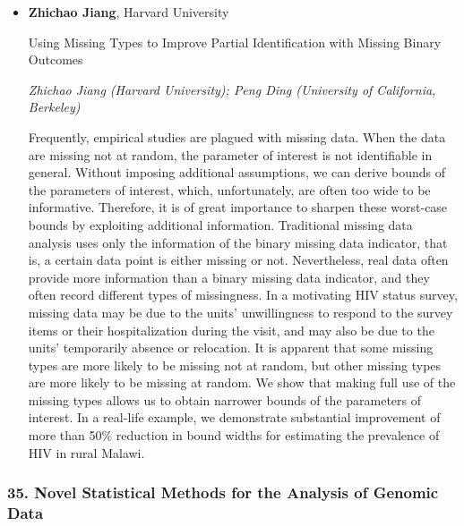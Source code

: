 \begin{itemize}
\item \textbf{Zhichao Jiang}, Harvard University

Using Missing Types to Improve Partial Identification with Missing Binary Outcomes

\emph{\footnotesize Zhichao Jiang (Harvard University); Peng Ding (University of California, Berkeley)}

Frequently, empirical studies are plagued with missing data. When the data are missing not at random, the parameter of interest is not identifiable in general. Without imposing additional assumptions, we can derive bounds of the parameters of interest, which, unfortunately, are often too wide to be informative. Therefore, it is of great importance to sharpen these worst-case bounds by exploiting additional information.  Traditional missing data analysis uses only the information of the binary missing data indicator, that is, a certain data point is either missing or not. Nevertheless, real data often provide more information than a binary missing data indicator, and they often record different types of missingness. In a motivating HIV status survey, missing data may be due to the units' unwillingness to respond to the survey items or their hospitalization during the visit, and may also be due to the units' temporarily absence or relocation. It is apparent that some missing types are more likely to be missing not at random, but  other missing types are more likely to be missing at random. We show that making full use of the missing types allows us to obtain narrower bounds of the parameters of interest. In a real-life example, we demonstrate substantial improvement of more than 50\% reduction in bound widths for estimating the prevalence of HIV in rural Malawi.

\end{itemize}

\subsubsection*{35. Novel Statistical Methods for the Analysis of Genomic Data}

